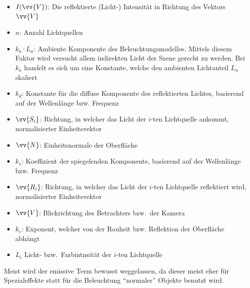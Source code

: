 \begin{itemize}
    \item $I(\vv{V})$:              Die reflektierte (Licht-) Intensität in Richtung des Vektors $\vv{V}$
    \item $n$:                      Anzahl Lichtquellen
    \item $k_{a} \cdot L_{a}$:      Ambiente Komponente des
                                    Beleuchtungsmodelles. Mittels diesem Faktor
                                    wird versucht allem indirekten Licht der
                                    Szene gerecht zu werden. Bei $k_{a}$
                                    handelt es sich um eine Konstante, welche
                                    den ambienten Lichtanteil $L_{a}$ skaliert
    \item $k_{d}$:                  Konstante für die diffuse Komponente des
                                    reflektierten Lichtes, basierend auf der
                                    Wellenlänge bzw. Frequenz
    \item $\vv{S_{i}}$:             Richtung, in welcher das Licht der $i$-ten
                                    Lichtquelle ankommt, normalisierter
                                    Einheitsvektor
    \item $\vv{N}$:                 Einheitsnormale der Oberfläche
    \item $k_{s}$:                  Koeffizient der spiegelenden Komponente,
                                    basierend auf der Wellenlänge bzw. Frequenz
    \item $\vv{R_{i}}$:             Richtung, in welcher das Licht der $i$-ten
                                    Lichtquelle reflektiert wird,
                                    normalisierter Einheitsvektor
    \item $\vv{V}$:                 Blickrichtung des Betrachters bzw.\ der
                                    Kamera
    \item $k_{e}$:                  Exponent, welcher von der Rauheit bzw.
                                    Reflektion der Oberfläche abhängt
    \item $L_{i}$                   Licht- bzw.\ Farbintnsität der $i$-ten
                                    Lichtquelle
\end{itemize}

Meist wird der emissive Term bewusst weggelassen, da dieser meist eher für
Spezialeffekte statt für die Beleuchtung ``normaler'' Objekte benutzt wird.

